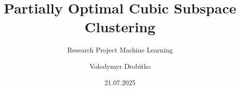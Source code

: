 \documentclass[t]{beamer}
\title{\Large Partially Optimal Cubic Subspace Clustering}
\subtitle{\small Research Project Machine Learning}
\author{Volodymyr Drobitko}
\institute{Technische Universität Dresden}
\date{21.07.2025}
\begin{document}
\frame{\titlepage}





\end{document}

